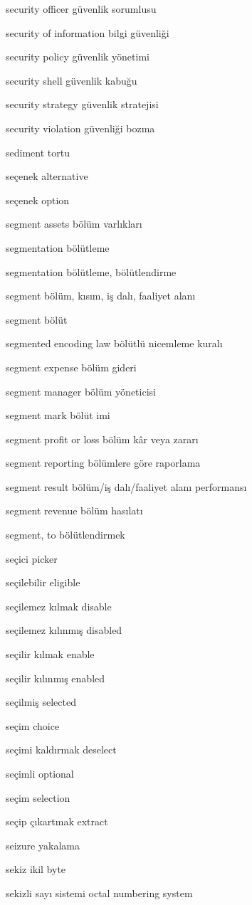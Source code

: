 \documentclass[12pt,fleqn]{article}\usepackage{../../common}
\begin{document}
security officer güvenlik sorumlusu

security of information bilgi güvenliği

security policy güvenlik yönetimi

security shell güvenlik kabuğu

security strategy güvenlik stratejisi

security violation güvenliği bozma

sediment tortu

seçenek alternative

seçenek option

segment assets bölüm varlıkları

segmentation bölütleme

segmentation bölütleme, bölütlendirme

segment bölüm, kısım, iş dalı, faaliyet alanı

segment bölüt

segmented encoding law bölütlü nicemleme kuralı

segment expense bölüm gideri

segment manager bölüm yöneticisi

segment mark bölüt imi

segment profit or loss bölüm kâr veya zararı

segment reporting bölümlere göre raporlama

segment result bölüm/iş dalı/faaliyet alanı performansı

segment revenue bölüm hasılatı

segment, to bölütlendirmek

seçici picker

seçilebilir eligible

seçilemez kılmak disable

seçilemez kılınmış disabled

seçilir kılmak enable

seçilir kılınmış enabled

seçilmiş selected

seçim choice

seçimi kaldırmak deselect

seçimli optional

seçim selection

seçip çıkartmak extract

seizure yakalama

sekiz ikil byte

sekizli sayı sistemi octal numbering system
\end{document}
